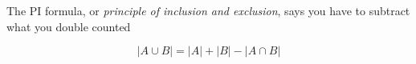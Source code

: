
The PI formula, or {\it principle of inclusion and exclusion}, says you have to subtract 
what you double counted 

$$|A \cup B| = |A| + |B| - |A \cap B|$$

\bye 

